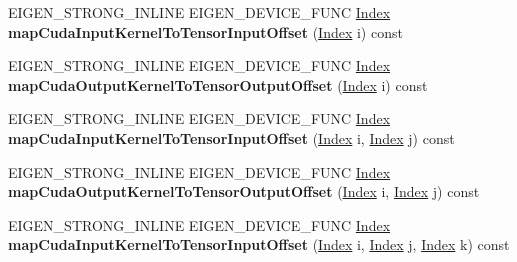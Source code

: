 \begin{DoxyCompactItemize}
E\+I\+G\+E\+N\+\_\+\+S\+T\+R\+O\+N\+G\+\_\+\+I\+N\+L\+I\+NE E\+I\+G\+E\+N\+\_\+\+D\+E\+V\+I\+C\+E\+\_\+\+F\+U\+NC \hyperlink{namespace_eigen_a62e77e0933482dafde8fe197d9a2cfde}{Index} {\bfseries map\+Cuda\+Input\+Kernel\+To\+Tensor\+Input\+Offset} (\hyperlink{namespace_eigen_a62e77e0933482dafde8fe197d9a2cfde}{Index} i) const
\item 
\mbox{\label{class_eigen_1_1internal_1_1_index_mapper_a03372c959d647327757d16140ac343d1}} 
E\+I\+G\+E\+N\+\_\+\+S\+T\+R\+O\+N\+G\+\_\+\+I\+N\+L\+I\+NE E\+I\+G\+E\+N\+\_\+\+D\+E\+V\+I\+C\+E\+\_\+\+F\+U\+NC \hyperlink{namespace_eigen_a62e77e0933482dafde8fe197d9a2cfde}{Index} {\bfseries map\+Cuda\+Output\+Kernel\+To\+Tensor\+Output\+Offset} (\hyperlink{namespace_eigen_a62e77e0933482dafde8fe197d9a2cfde}{Index} i) const
\item 
\mbox{\label{class_eigen_1_1internal_1_1_index_mapper_ae00d36a9e88a3a1a21f959925e8cc130}} 
E\+I\+G\+E\+N\+\_\+\+S\+T\+R\+O\+N\+G\+\_\+\+I\+N\+L\+I\+NE E\+I\+G\+E\+N\+\_\+\+D\+E\+V\+I\+C\+E\+\_\+\+F\+U\+NC \hyperlink{namespace_eigen_a62e77e0933482dafde8fe197d9a2cfde}{Index} {\bfseries map\+Cuda\+Input\+Kernel\+To\+Tensor\+Input\+Offset} (\hyperlink{namespace_eigen_a62e77e0933482dafde8fe197d9a2cfde}{Index} i, \hyperlink{namespace_eigen_a62e77e0933482dafde8fe197d9a2cfde}{Index} j) const
\item 
\mbox{\label{class_eigen_1_1internal_1_1_index_mapper_a392ebe09522f472132f04ebbdcae3406}} 
E\+I\+G\+E\+N\+\_\+\+S\+T\+R\+O\+N\+G\+\_\+\+I\+N\+L\+I\+NE E\+I\+G\+E\+N\+\_\+\+D\+E\+V\+I\+C\+E\+\_\+\+F\+U\+NC \hyperlink{namespace_eigen_a62e77e0933482dafde8fe197d9a2cfde}{Index} {\bfseries map\+Cuda\+Output\+Kernel\+To\+Tensor\+Output\+Offset} (\hyperlink{namespace_eigen_a62e77e0933482dafde8fe197d9a2cfde}{Index} i, \hyperlink{namespace_eigen_a62e77e0933482dafde8fe197d9a2cfde}{Index} j) const
\item 
\mbox{\label{class_eigen_1_1internal_1_1_index_mapper_a068a1781dcce4e4143ed387ee3046dbb}} 
E\+I\+G\+E\+N\+\_\+\+S\+T\+R\+O\+N\+G\+\_\+\+I\+N\+L\+I\+NE E\+I\+G\+E\+N\+\_\+\+D\+E\+V\+I\+C\+E\+\_\+\+F\+U\+NC \hyperlink{namespace_eigen_a62e77e0933482dafde8fe197d9a2cfde}{Index} {\bfseries map\+Cuda\+Input\+Kernel\+To\+Tensor\+Input\+Offset} (\hyperlink{namespace_eigen_a62e77e0933482dafde8fe197d9a2cfde}{Index} i, \hyperlink{namespace_eigen_a62e77e0933482dafde8fe197d9a2cfde}{Index} j, \hyperlink{namespace_eigen_a62e77e0933482dafde8fe197d9a2cfde}{Index} k) const

\end{DoxyCompactItemize}
